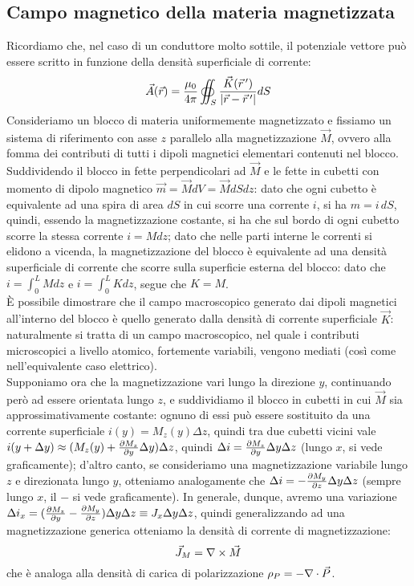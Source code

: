 \subsection{Campo magnetico della materia magnetizzata}

Ricordiamo che, nel caso di un conduttore molto sottile, il potenziale vettore può essere scritto in funzione della densità superficiale di corrente:
\begin{equation}
	\vec{A}(\vec{r}) = \frac{\mu_0}{4\pi} \oiint_S \frac{\vec{K}(\vec{r}\,')}{\left\lvert\vec{r} - \vec{r}\,'\right\rvert} dS
	\label{eq:12}
\end{equation}
Consideriamo un blocco di materia uniformemente magnetizzato e fissiamo un sistema di riferimento con asse $ z $ parallelo alla magnetizzazione $ \vec{M} $, ovvero alla fomma dei contributi di tutti i dipoli magnetici elementari contenuti nel blocco. \\ 
%
Suddividendo il blocco in fette perpendicolari ad $ \vec{M} $ e le fette in cubetti con momento di dipolo magnetico $ \vec{m} = \vec{M} dV = \vec{M} dSdz $: dato che ogni cubetto è equivalente ad una spira di area $ dS $ in cui scorre una corrente $ i $, si ha $ m = i \,dS $, quindi, essendo la magnetizzazione costante, si ha che sul bordo di ogni cubetto scorre la stessa corrente $ i = M dz $; dato che nelle parti interne le correnti si elidono a vicenda, la magnetizzazione del blocco è equivalente ad una densità superficiale di corrente che scorre sulla superficie esterna del blocco: dato che $ i = \int_0^L M dz $ e $ i = \int_0^L K dz $, segue che $ K = M $. \\ 
%
È possibile dimostrare che il campo macroscopico generato dai dipoli magnetici all'interno del blocco è quello generato dalla densità di corrente superficiale $ \vec{K} $: naturalmente si tratta di un campo macroscopico, nel quale i contributi microscopici a livello atomico, fortemente variabili, vengono mediati (così come nell'equivalente caso elettrico). \\ 
%
Supponiamo ora che la magnetizzazione vari lungo la direzione $ y $, continuando però ad essere orientata lungo $ z $, e suddividiamo il blocco in cubetti in cui $ \vec{M} $ sia approssimativamente costante: ognuno di essi può essere sostituito da una corrente superficiale $ i(y) = M_z(y) \Delta z $, quindi tra due cubetti vicini vale $ i(y+\Delta y) \approx (M_z(y) + \frac{\partial M_z}{\partial y}\Delta y) \Delta z $, quindi $ \Delta i = \frac{\partial M_z}{\partial y} \Delta y \Delta z $ (lungo $ x $, si vede graficamente); d'altro canto, se consideriamo una magnetizzazione variabile lungo $ z $ e direzionata lungo $ y $, otteniamo analogamente che $ \Delta i = - \frac{\partial M_y}{\partial z} \Delta y \Delta z $ (sempre lungo $ x $, il $ - $ si vede graficamente). In generale, dunque, avremo una variazione $ \Delta i_x = (\frac{\partial M_z}{\partial y} - \frac{\partial M_y}{\partial z}) \Delta y \Delta z \equiv J_x \Delta y \Delta z $, quindi generalizzando ad una magnetizzazione generica otteniamo la densità di corrente di magnetizzazione:
\begin{equation}
	\vec{J}_M = \nabla\times\vec{M}
	\label{eq:13}
\end{equation}
che è analoga alla densità di carica di polarizzazione $ \rho_P = -\nabla\cdot\vec{P} $. 

